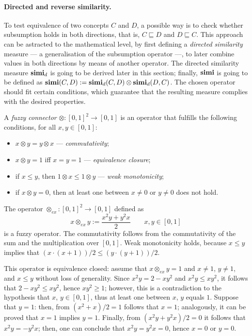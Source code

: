   \paragraph{Directed and reverse similarity.}
  To test equivalence of two concepts \(C\) and \(D\), a possible way is to check whether subsumption holds in both directions, that is, \(C \sqsubseteq D\) and \(D \sqsubseteq C\).
  This approach can be astracted to the mathematical level, by first defining a \emph{directed similarity} measure --- a generalisation of the subsumption operator ---, to later combine values in both directions by means of another operator.
  The directed similarity measure \(\operatorname{\mathbf{simi}}_d\) is going to be derived later in this section; finally, \(\operatorname{\mathbf{simi}}\) is going to be defined as \(\operatorname{\mathbf{simi}}(C,D) := \operatorname{\mathbf{simi}}_d(C,D) \otimes \operatorname{\mathbf{simi}}_d(D,C)\).
  The chosen operator should fit certain conditions, which guarantee that the resulting measure complies with the desired properties.
  \begin{definition}
    A \emph{fuzzy connector} \(\otimes \colon {[0,1]}^2 \to [0,1]\) is an operator that fulfills the following conditions, for all \(x, y \in [0,1]\):
    \begin{itemize}
      \item \(x \otimes y = y \otimes x\) --- \emph{commutativity};
      \item \(x \otimes y = 1\) iff \(x = y = 1\) --- \emph{equivalence closure};
      \item if \(x \le y\), then \(1 \otimes x \le 1 \otimes y\) --- \emph{weak monotonicity};
      \item if \(x \otimes y = 0\), then at least one between \(x \ne 0\) or \(y \ne 0\) does not hold.
    \end{itemize}
  \end{definition}

  \begin{example}
    The operator \(\otimes_{ex} \colon {[0,1]}^2 \to [0,1]\) defined as
    \[
    x \otimes_{ex} y := \frac{x^2y + y^2x}{2} \qquad x,y \in [0,1]
    \]
    is a fuzzy operator.
    The commutativity follows from the commutativity of the sum and the multiplication over \([0,1]\). Weak monotonicity holds, because \(x \le y\) implies that \((x \cdot (x+1))/2 \le (y \cdot (y+1))/2\).

    This operator is equivalence closed: assume that \(x \otimes_{ex} y = 1\) and \(x \ne 1\), \(y \ne 1\), and \(x \le y\) without loss of generality.
    Since \(x^2y = 2 - xy^2\) and \(x^2y \le xy^2\), it follows that \(2-xy^2 \le xy^2\), hence \(xy^2 \ge 1\); however, this is a contradiction to the hypothesis that \(x\), \(y \in [0,1]\), thus at least one between \(x\), \(y\) equals \(1\).
    Suppose that \(y = 1\): then, from \((x^2 + x)/2 = 1\) follows that \(x = 1\); analogously, it can be proved that \(x = 1\) implies \(y = 1\).
  Finally, from \((x^2y + y^2x)/2 = 0\) it follows that \(x^2y = - y^2x\); then, one can conclude that \(x^2y = y^2x = 0\), hence \(x = 0\) or \(y = 0\).
\end{example}
  
